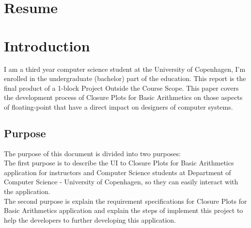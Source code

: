 \documentclass[11pt]{article}
\begin{document}
\section*{Resume}

\newpage
\begin{center}
\tableofcontents
\end{center}

\newpage
\section{Introduction}
I am a third year computer science student at the University of Copenhagen, I'm enrolled in the undergraduate (bachelor) part of the education. This report is the final product of a 1-block Project Outside the Course Scope. This paper covers the development process of Closure Plots for Basic Arithmetics on those aspects of floating-point that have a direct impact on designers of computer systems.

\subsection{Purpose}
The purpose of this document is divided into two purposes:\\

The first purpose is to describe the UI to Closure Plots for Basic Arithmetics application for instructors and Computer Science students at Department of Computer Science - University of Copenhagen, so they can easily interact with the application.\\

The second purpose is explain the requirement specifications for Closure Plots for Basic Arithmetics application and explain the steps of implement this project to help the developers to further developing this application.



\end{document}
